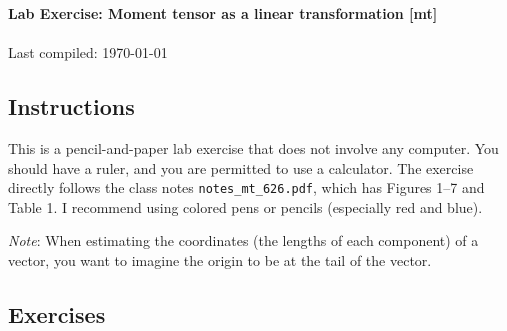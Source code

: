 \documentclass[11pt,titlepage,fleqn]{article}
\newcommand{\mtfile}{\texttt{notes\_mt\_626.pdf}}
\begin{document}

\begin{spacing}{1.2}
\centering
{\large \bf Lab Exercise: Moment tensor as a linear transformation [mt]} \\
\cltag\ \\
Last compiled: \today
\end{spacing}


\subsection*{Instructions}

This is a pencil-and-paper lab exercise that does not involve any computer. You should have a ruler, and you are permitted to use a calculator. The exercise directly follows the class notes \mtfile, which has Figures 1--7 and Table 1. I recommend using colored pens or pencils (especially red and blue).

\medskip\noindent
{\em Note}: When estimating the coordinates (\ie the lengths of each component) of a vector, you want to imagine the origin to be at the tail of the vector. 


\subsection*{Exercises}
\end{document}
